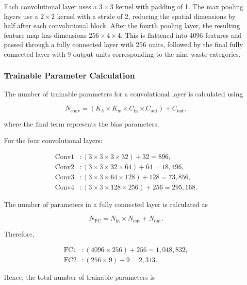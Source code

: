 \documentclass[12pt,a4paper]{article}
\begin{document}
Each convolutional layer uses a $3\times3$ kernel with padding of 1. The
max pooling layers use a $2\times2$ kernel with a stride of 2, reducing the
spatial dimensions by half after each convolutional block. After the fourth
pooling layer, the resulting feature map has dimensions
$256\times4\times4$. This is flattened into 4096 features and passed through
a fully connected layer with 256 units, followed by the final fully connected
layer with 9 output units corresponding to the nine waste categories.

\subsubsection{Trainable Parameter Calculation}

The number of trainable parameters for a convolutional layer is calculated
using

\begin{equation}
N_{\mathrm{conv}} =
(K_h \times K_w \times C_{\mathrm{in}} \times C_{\mathrm{out}})
+ C_{\mathrm{out}},
\end{equation}

where the final term represents the bias parameters.

For the four convolutional layers:

\begin{align*}
\mathrm{Conv1} &: (3\times3\times3\times32)+32 = 896,\\
\mathrm{Conv2} &: (3\times3\times32\times64)+64 = 18,496,\\
\mathrm{Conv3} &: (3\times3\times64\times128)+128 = 73,856,\\
\mathrm{Conv4} &: (3\times3\times128\times256)+256 = 295,168.
\end{align*}

The number of parameters in a fully connected layer is calculated as

\begin{equation}
N_{\mathrm{FC}} =
N_{\mathrm{in}}\times N_{\mathrm{out}} + N_{\mathrm{out}}.
\end{equation}

Therefore,

\begin{align*}
\mathrm{FC1} &: (4096\times256)+256 = 1,048,832,\\
\mathrm{FC2} &: (256\times9)+9 = 2,313.
\end{align*}

Hence, the total number of trainable parameters is
\end{document}

